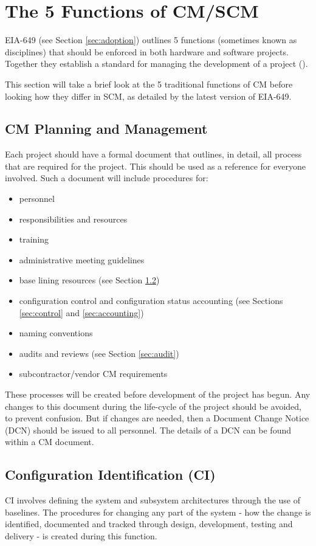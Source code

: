 \documentclass[cmpstyle]{ueacmpstyle}
\begin{document}
	\section{The 5 Functions of CM/SCM} \label{sec:principles}
	EIA-649 (see Section \ref{sec:adoption}) outlines 5 functions (sometimes known as disciplines) that should be enforced in both hardware and software projects. Together they establish a standard for managing the development of a project (\cite{mil-hdbk}). 
	
	This section will take a brief look at the 5 traditional functions of CM before looking how they differ in SCM, as detailed by the latest version of EIA-649.
	
		\subsection{CM Planning and Management} \label{sec:planning}
		Each project should have a formal document that outlines, in detail, all process that are required for the project. This should be used as a reference for everyone involved. Such a document will include procedures for:
		\begin{itemize}
			\item personnel
			\item responsibilities and resources
			\item training
			\item administrative meeting guidelines
			\item base lining resources (see Section \ref{sec:identify})
			\item configuration control and configuration status accounting (see Sections \ref{sec:control} and \ref{sec:accounting})
			\item naming conventions
			\item audits and reviews (see Section \ref{sec:audit})
			\item subcontractor/vendor CM requirements
		\end{itemize}
		These processes will be created before development of the project has begun. Any changes to this document during the life-cycle of the project should be avoided, to prevent confusion. But if changes are needed, then a Document Change Notice (DCN) should be issued to all personnel. The details of a DCN can be found within a CM document.
		
		\subsection{Configuration Identification (CI)} \label{sec:identify}
		CI involves defining the system and subsystem architectures through the use of baselines. The procedures for changing any part of the system - how the change is identified, documented and tracked through design, development, testing and delivery - is created during this function. 
		
\end{document}
